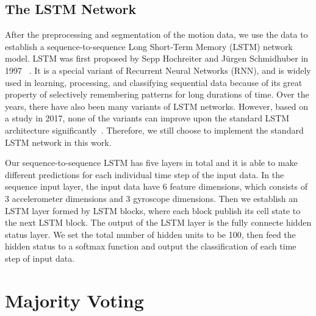 

%
\subsection{The LSTM Network}
After the preprocessing and segmentation of the motion data, we use the data to establish a sequence-to-sequence Long Short-Term Memory (LSTM) network model. LSTM was first proposed by Sepp Hochreiter and J{\"u}rgen Schmidhuber in 1997 ~\cite{hochreiter1997long}. It is a special variant of  Recurrent Neural Networks (RNN), and is widely used in learning, processing, and classifying sequential data because of 
its great property of selectively remembering patterns for long durations of time. Over the years, there have also been many variants of LSTM networks. However, based on a study in 2017, none of the variants can improve upon the standard LSTM architecture significantly~\cite{greff2017lstm}. Therefore, we still choose to implement the standard LSTM network in this work.


Our sequence-to-sequence LSTM has five layers in total and it is able to make different predictions for each individual time step of the input data. In the sequence input layer, the input data have 6 feature dimensions, which consists of 3 accelerometer dimensions and 3 gyroscope dimensions. Then we establish an LSTM layer formed by LSTM blocks, where each block publish its cell state to the next LSTM block. The output of the LSTM layer is the fully connecte hidden status layer. We set the total number of hidden units to be 100, then feed the hidden status to a softmax function and output the classification of each time step of input data.


%
\section{Majority Voting}

%	

